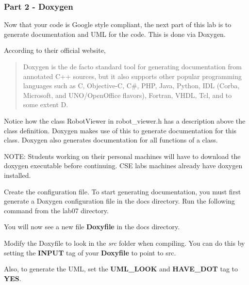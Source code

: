\subsubsection*{Part 2 -\/ Doxygen}

Now that your code is Google style compliant, the next part of this lab is to generate documentation and U\+ML for the code. This is done via Doxygen.

According to their official website, \begin{quote}
Doxygen is the de facto standard tool for generating documentation from annotated C++ sources, but it also supports other popular programming languages such as C, Objective-\/C, C\#, P\+HP, Java, Python, I\+DL (Corba, Microsoft, and U\+N\+O/\+Open\+Office flavors), Fortran, V\+H\+DL, Tcl, and to some extent D. \end{quote}


Notice how the class Robot\+Viewer in robot\+\_\+viewer.\+h has a description above the class definition. Doxygen makes use of this to generate documentation for this class. Doxygen also generates documentation for all functions of a class.

N\+O\+TE\+: Students working on their personal machines will have to download the doxygen executable before continuing. C\+SE labs machines already have doxygen installed.


\begin{DoxyEnumerate}
\item Create the configuration file. To start generating documentation, you must first generate a Doxygen configuration file in the docs directory. Run the following command from the lab07 directory.
\end{DoxyEnumerate}


\begin{DoxyCode}{0}
\end{DoxyCode}


You will now see a new file {\bfseries{Doxyfile}} in the docs directory.


\begin{DoxyEnumerate}
\item Modify the Doxyfile to look in the {\itshape src} folder when compiling. You can do this by setting the {\bfseries{I\+N\+P\+UT}} tag of your {\bfseries{Doxyfile}} to point to src.
\end{DoxyEnumerate}


\begin{DoxyCode}{0}
\end{DoxyCode}
 Also, to generate the U\+ML, set the {\bfseries{U\+M\+L\+\_\+\+L\+O\+OK}} and {\bfseries{H\+A\+V\+E\+\_\+\+D\+OT}} tag to {\bfseries{Y\+ES}}.

